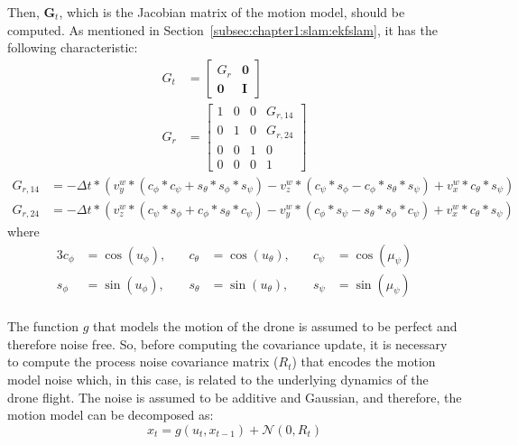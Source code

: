 Then, $\textbf{G}_t$, which is the Jacobian matrix of the motion model, should be computed. As mentioned in Section~\ref{subsec:chapter1:slam:ekfslam}, it has the following characteristic:
\begin{align}
    G_t &= \begin{bmatrix}
        G_r & \textbf{0} \\
        \textbf{0} & \textbf{I}
    \end{bmatrix}\\
    G_r &= \begin{bmatrix}
        1 & 0 & 0 & G_{r, 14} \\
        0 & 1 & 0 & G_{r, 24} \\
        0 & 0 & 1 & 0 \\
        0 & 0 & 0 & 1
    \end{bmatrix}
\end{align}
\begin{align*}
     G_{r, 14} &= -\Delta t * (v_y^w * (c_{\phi} * c_{\psi} + s_{\theta} * s_{\phi} * s_{\psi}) - v_z^w * (c_{\psi} * s_{\phi} - c_{\phi} * s_{\theta} * s_{\psi}) + v_x^w * c_{\theta} * s_{\psi}) \\
     G_{r, 24} &= -\Delta t * (v_z^w * (c_{\psi} * s_{\phi} + c_{\phi} * s_{\theta} * c_{\psi}) -v_y^w * (c_{\phi} * s_{\psi} - s_{\theta} * s_{\phi} * c_{\psi}) + v_x^w * c_{\theta} * s_{\psi})
\end{align*}
where
\begin{alignat*}{3}
    c_{\phi} &= \cos{\left(u_{\phi}\right)}, \quad & c_{\theta} &= \cos{\left(u_{\theta}\right)}, \quad & c_{\psi} &= \cos{\left(\mu_{\psi}\right)} \\
    s_{\phi} &= \sin{\left(u_{\phi}\right)}, \quad & s_{\theta} &= \sin{\left(u_{\theta}\right)}, \quad & s_{\psi} &= \sin{\left(\mu_{\psi}\right)}
\end{alignat*}\\
The function $g$ that models the motion of the drone is assumed to be perfect and therefore noise free. So, before computing the covariance update, it is necessary to compute the process noise covariance matrix ($R_t$) that encodes the motion model noise which, in this case, is related to the underlying dynamics of the drone flight. The noise is assumed to be additive and Gaussian, and therefore, the motion model can be decomposed as:
\begin{equation}
    x_t = g(u_t, x_{t-1}) + \mathcal{N}\left(0, R_t\right)
    \label{eq:chapter2:prediction:motion_w_noise}
\end{equation}

